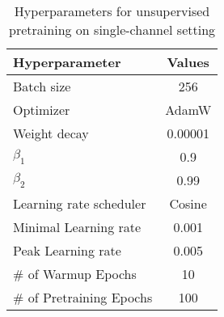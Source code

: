 \begin{table}[thpb]
    \centering
    \caption{Hyperparameters for \tokenizer unsupervised pretraining on single-channel setting}
    \begin{tabular}{lc}
        \hline
        \textbf{Hyperparameter}& \textbf{Values}  \\
        \hline
          Batch size & 256 \\
          Optimizer & AdamW \\
          Weight decay & 0.00001 \\
          $\beta_1$ & 0.9\\
          $\beta_2$ & 0.99\\
          Learning rate scheduler & Cosine\\
          Minimal Learning rate & 0.001 \\
          Peak Learning rate & 0.005 \\
          \# of Warmup Epochs & 10 \\
          \# of Pretraining Epochs & 100\\

          
       
        \hline
    \end{tabular}%
    \label{tab:tfm_tokenizer_training_params}
\end{table}

